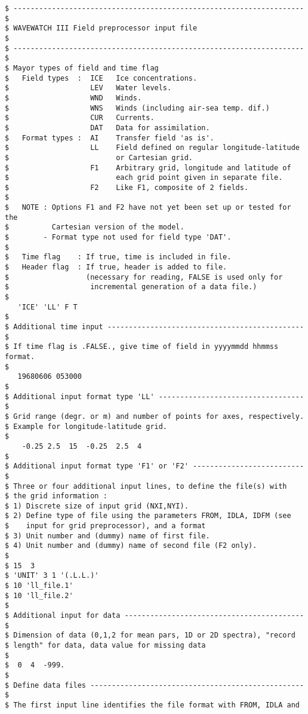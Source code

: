 \begin{verbatim}
$ -------------------------------------------------------------------- $
$ WAVEWATCH III Field preprocessor input file                          $
$ -------------------------------------------------------------------- $
$ Mayor types of field and time flag
$   Field types  :  ICE   Ice concentrations.
$                   LEV   Water levels.
$                   WND   Winds.
$                   WNS   Winds (including air-sea temp. dif.)
$                   CUR   Currents.
$                   DAT   Data for assimilation.
$   Format types :  AI    Transfer field 'as is'.
$                   LL    Field defined on regular longitude-latitude
$                         or Cartesian grid.
$                   F1    Arbitrary grid, longitude and latitude of
$                         each grid point given in separate file.
$                   F2    Like F1, composite of 2 fields.
$
$   NOTE : Options F1 and F2 have not yet been set up or tested for the
$          Cartesian version of the model.
$        - Format type not used for field type 'DAT'.
$
$   Time flag    : If true, time is included in file.
$   Header flag  : If true, header is added to file.
$                  (necessary for reading, FALSE is used only for
$                   incremental generation of a data file.)
$
   'ICE' 'LL' F T
$
$ Additional time input ---------------------------------------------- $
$ If time flag is .FALSE., give time of field in yyyymmdd hhmmss format.
$
   19680606 053000
$
$ Additional input format type 'LL' ---------------------------------- $
$ Grid range (degr. or m) and number of points for axes, respectively.
$ Example for longitude-latitude grid.
$
    -0.25 2.5  15  -0.25  2.5  4
$
$ Additional input format type 'F1' or 'F2' -------------------------- $
$ Three or four additional input lines, to define the file(s) with
$ the grid information :
$ 1) Discrete size of input grid (NXI,NYI).
$ 2) Define type of file using the parameters FROM, IDLA, IDFM (see
$    input for grid preprocessor), and a format
$ 3) Unit number and (dummy) name of first file.
$ 4) Unit number and (dummy) name of second file (F2 only).
$
$ 15  3                                              
$ 'UNIT' 3 1 '(.L.L.)'
$ 10 'll_file.1'
$ 10 'll_file.2'      
$
$ Additional input for data ------------------------------------------ $
$ Dimension of data (0,1,2 for mean pars, 1D or 2D spectra), "record
$ length" for data, data value for missing data
$
$  0  4  -999.
$
$ Define data files -------------------------------------------------- $
$ The first input line identifies the file format with FROM, IDLA and

\end{verbatim}

